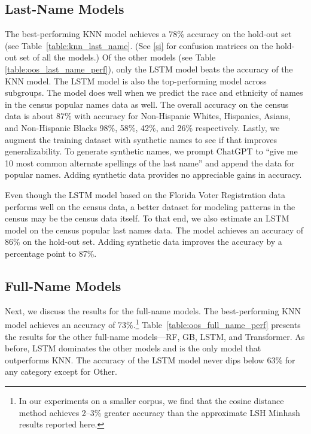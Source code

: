 \documentclass[12pt, letterpaper]{article}
\begin{document}
\subsection*{Last-Name Models}
The best-performing KNN model achieves a 78\% accuracy on the hold-out set (see Table~\ref{table:knn_last_name}. (See \ref{si} for confusion matrices on the hold-out set of all the models.) Of the other models (see Table~ \ref{table:oos_last_name_perf}), only the LSTM model beats the accuracy of the KNN model. The LSTM model is also the top-performing model across subgroups. The model does well when we predict the race and ethnicity of names in the census popular names data as well. The overall accuracy on the census data is about 87\% with accuracy for Non-Hispanic Whites, Hispanics, Asians, and Non-Hispanic Blacks 98\%, 58\%, 42\%, and 26\% respectively. Lastly, we augment the training dataset with synthetic names to see if that improves generalizability. To generate synthetic names, we prompt  ChatGPT to ``give me 10 most common alternate spellings of the last name'' and append the data for popular names. Adding synthetic data provides no appreciable gains in accuracy.



Even though the LSTM model based on the Florida Voter Registration data performs well on the census data, a better dataset for modeling patterns in the census may be the census data itself. To that end, we also estimate an LSTM model on the census popular last names data. The model achieves an accuracy of 86\% on the hold-out set. Adding synthetic data improves the accuracy by a percentage point to 87\%.

\subsection*{Full-Name Models}
Next, we discuss the results for the full-name models. The best-performing KNN model achieves an accuracy of 73\%.\footnote{In our experiments on a smaller corpus, we find that the cosine distance method achieves 2--3\% greater accuracy than the approximate LSH Minhash results reported here.} Table~\ref{table:oos_full_name_perf} presents the results for the other full-name models---RF, GB, LSTM, and Transformer. As before, LSTM dominates the other models and is the only model that outperforms KNN. The accuracy of the LSTM model never dips below 63\% for any category except for Other.


\end{document}
